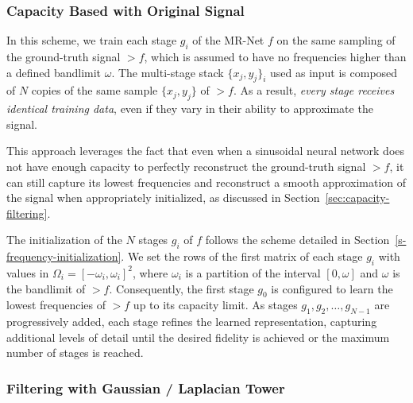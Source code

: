 \subsubsection{Capacity Based with Original Signal}
In this scheme, we train each stage $g_i$ of the MR-Net $f$ on the same sampling of the ground-truth signal $\gt{f}$, which is assumed to have no frequencies higher than a defined bandlimit $\omega$. The multi-stage stack $\{x_j, y_j\}_i$ used as input is composed of $N$ copies of the same sample $\{x_j, y_j\}$ of $\gt{f}$. As a result, \textit{every stage receives identical training data}, even if they vary in their ability to approximate the signal.

This approach leverages the fact that even when a sinusoidal neural network does not have enough capacity to perfectly reconstruct the ground-truth signal $\gt{f}$, it can still capture its lowest frequencies and reconstruct a smooth approximation of the signal when appropriately initialized, as discussed in Section~\ref{sec:capacity-filtering}. 



The initialization of the $N$ stages $g_i$ of $f$ follows the scheme detailed in Section~\ref{s-frequency-initialization}. We set the rows of the first matrix of each stage $g_i$ with values in $\Omega_i=[-\omega_i, \omega_i]^2$, where $\omega_i$ is a partition of the interval $[0,\omega]$ and $\omega$ is the bandlimit of $\gt{f}$. Consequently, the first stage $g_0$ is configured to learn the lowest frequencies of $\gt{f}$ up to its capacity limit. As stages $g_1, g_2, \ldots, g_{N-1}$ are progressively added, each stage refines the learned representation, capturing additional levels of detail until the desired fidelity is achieved or the maximum number of stages is reached.


\subsubsection{Filtering with Gaussian / Laplacian Tower}

